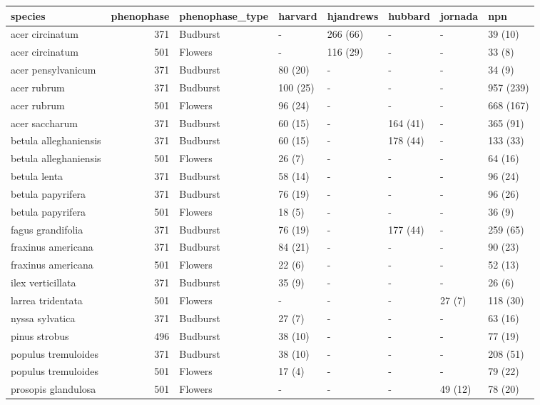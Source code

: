 \documentclass[a4paper,12pt]{article}
\begin{document}
\tiny
\begin{tabular}{l|r|l|l|l|l|l|l}
\hline
species & phenophase & phenophase\_type & harvard & hjandrews & hubbard & jornada & npn\\
\hline
acer circinatum & 371 & Budburst & - & 266 (66) & - & - & 39 (10)\\
\hline
acer circinatum & 501 & Flowers & - & 116 (29) & - & - & 33 (8)\\
\hline
acer pensylvanicum & 371 & Budburst & 80 (20) & - & - & - & 34 (9)\\
\hline
acer rubrum & 371 & Budburst & 100 (25) & - & - & - & 957 (239)\\
\hline
acer rubrum & 501 & Flowers & 96 (24) & - & - & - & 668 (167)\\
\hline
acer saccharum & 371 & Budburst & 60 (15) & - & 164 (41) & - & 365 (91)\\
\hline
betula alleghaniensis & 371 & Budburst & 60 (15) & - & 178 (44) & - & 133 (33)\\
\hline
betula alleghaniensis & 501 & Flowers & 26 (7) & - & - & - & 64 (16)\\
\hline
betula lenta & 371 & Budburst & 58 (14) & - & - & - & 96 (24)\\
\hline
betula papyrifera & 371 & Budburst & 76 (19) & - & - & - & 96 (26)\\
\hline
betula papyrifera & 501 & Flowers & 18 (5) & - & - & - & 36 (9)\\
\hline
fagus grandifolia & 371 & Budburst & 76 (19) & - & 177 (44) & - & 259 (65)\\
\hline
fraxinus americana & 371 & Budburst & 84 (21) & - & - & - & 90 (23)\\
\hline
fraxinus americana & 501 & Flowers & 22 (6) & - & - & - & 52 (13)\\
\hline
ilex verticillata & 371 & Budburst & 35 (9) & - & - & - & 26 (6)\\
\hline
larrea tridentata & 501 & Flowers & - & - & - & 27 (7) & 118 (30)\\
\hline
nyssa sylvatica & 371 & Budburst & 27 (7) & - & - & - & 63 (16)\\
\hline
pinus strobus & 496 & Budburst & 38 (10) & - & - & - & 77 (19)\\
\hline
populus tremuloides & 371 & Budburst & 38 (10) & - & - & - & 208 (51)\\
\hline
populus tremuloides & 501 & Flowers & 17 (4) & - & - & - & 79 (22)\\
\hline
prosopis glandulosa & 501 & Flowers & - & - & - & 49 (12) & 78 (20)\\

\end{tabular}
\end{document}
